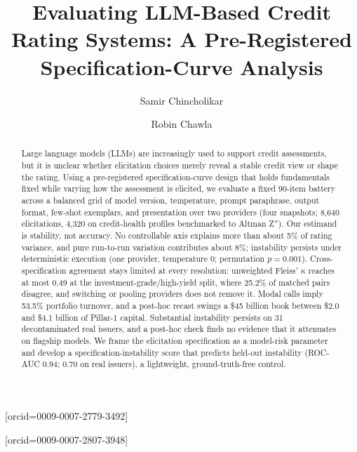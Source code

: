 \documentclass[a4paper,fleqn]{cas-sc}
\begin{document}
\let\WriteBookmarks\relax
\def\floatpagepagefraction{1}
\def\textpagefraction{.001}


\title[mode=title]{Evaluating LLM-Based Credit Rating Systems: A Pre-Registered Specification-Curve Analysis}

\author[1]{Samir Chincholikar}[orcid=0009-0007-2779-3492]

\author[1]{Robin Chawla}[orcid=0009-0007-2807-3948]
\cormark[1]



\begin{abstract}
Large language models (LLMs) are increasingly used to support credit assessments, but it is unclear
whether elicitation choices merely reveal a stable credit view or shape the rating. Using a pre-registered
specification-curve design that holds fundamentals fixed while varying how the assessment is elicited, we
evaluate a fixed 90-item battery across a balanced grid of model version, temperature, prompt paraphrase,
output format, few-shot exemplars, and presentation over two providers (four snapshots; 8{,}640
elicitations, 4{,}320 on credit-health profiles benchmarked to Altman Z$''$). Our estimand is stability,
not accuracy. No controllable axis explains more than about 5\% of rating variance, and pure run-to-run
variation contributes about 8\%; instability persists under deterministic execution (one provider,
temperature 0; permutation $p=0.001$). Cross-specification agreement stays limited at every resolution:
unweighted Fleiss' $\kappa$ reaches at most 0.49 at the investment-grade/high-yield split, where 25.2\% of
matched pairs disagree, and switching or pooling providers does not remove it. Modal calls imply 53.5\%
portfolio turnover, and a post-hoc recast swings a \$45 billion book between \$2.0 and \$4.1 billion of
Pillar-1 capital. Substantial instability persists on 31 decontaminated real issuers, and a post-hoc check
finds no evidence that it attenuates on flagship models. We frame the elicitation specification as a
model-risk parameter and develop a specification-instability score that predicts held-out instability
(ROC-AUC 0.94; 0.70 on real issuers), a lightweight, ground-truth-free control.
\end{abstract}
\end{document}
